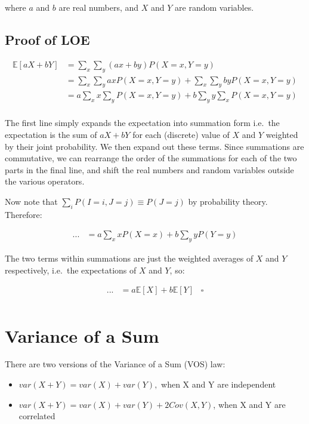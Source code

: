 \documentclass[
]{book}
\providecommand{\tightlist}{%
  \setlength{\itemsep}{0pt}\setlength{\parskip}{0pt}}
\begin{document}
where \(a\) and \(b\) are real numbers, and \(X\) and \(Y\) are random variables.

\hypertarget{proof-of-loe}{%
\subsection{Proof of LOE}\label{proof-of-loe}}

\begin{align}
    \mathbb{E}[aX + bY] &= \sum_x\sum_y (ax+by) P(X=x, Y=y) \label{eq:loe_sums} \\
    &= \sum_x\sum_y ax P(X=x, Y=y) + \sum_x\sum_y by P(X=x, Y=y) \\
    &= a\sum_x x\sum_y P(X=x, Y=y) + b \sum_y y \sum_x P(X=x, Y=y) \label{eq:loe_rearrange}\\ 
\end{align}

The first line simply expands the expectation into summation form i.e.~the expectation is the sum of \(aX + bY\) for each (discrete) value of \(X\) and \(Y\) weighted by their joint probability. We then expand out these terms. Since summations are commutative, we can rearrange the order of the summations for each of the two parts in the final line, and shift the real numbers and random variables outside the various operators.

Now note that \(\sum_{i} P(I=i, J=j) \equiv P(J=j)\) by probability theory. Therefore:

\begin{align}
    ... &= a\sum_x x P(X=x) + b\sum_y y P(Y = y)
\end{align}

The two terms within summations are just the weighted averages of \(X\) and \(Y\) respectively, i.e.~the expectations of \(X\) and \(Y\), so:

\begin{align}
    ... &= a\mathbb{E}[X] + b\mathbb{E}[Y] \; \; \; \square \\
\end{align}

\hypertarget{variance-of-a-sum}{%
\section{Variance of a Sum}\label{variance-of-a-sum}}

There are two versions of the Variance of a Sum (VOS) law:

\begin{itemize}
\tightlist
\item
  \(var(X + Y) = var(X) + var(Y),\) when X and Y are independent
\item
  \(var(X+Y) = var(X) + var(Y) + 2Cov(X,Y)\), when X and Y are correlated
\end{itemize}
\end{document}
